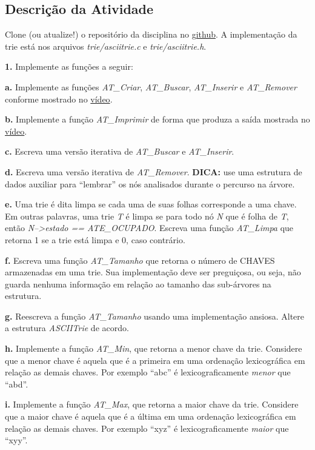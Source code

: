 \documentclass[]{article}
\begin{document}
\hypertarget{descriuxe7uxe3o-da-atividade}{%
\subsection{Descrição da Atividade}\label{descriuxe7uxe3o-da-atividade}}

Clone (ou atualize!) o repositório da disciplina no
\href{https://github.com/julianofoleiss/BCC33A}{github}. A implementação
da trie está nos arquivos \emph{trie/asciitrie.c} e
\emph{trie/asciitrie.h}.

\textbf{1.} Implemente as funções a seguir:

\textbf{a.} Implemente as funções \emph{AT\_Criar}, \emph{AT\_Buscar},
\emph{AT\_Inserir} e \emph{AT\_Remover} conforme mostrado no
\href{https://youtu.be/Spmw4hTo7ek}{vídeo}.

\textbf{b.} Implemente a função \emph{AT\_Imprimir} de forma que produza
a saída mostrada no \href{https://youtu.be/Spmw4hTo7ek?t=4155}{vídeo}.

\textbf{c.} Escreva uma versão iterativa de \emph{AT\_Buscar} e
\emph{AT\_Inserir}.

\textbf{d.} Escreva uma versão iterativa de \emph{AT\_Remover}.
\textbf{DICA:} use uma estrutura de dados auxiliar para ``lembrar'' os
nós analisados durante o percurso na árvore.

\textbf{e.} Uma trie é dita limpa se cada uma de suas folhas corresponde
a uma chave. Em outras palavras, uma trie \emph{T} é limpa se para todo
nó \emph{N} que é folha de \emph{T}, então \emph{N--\textgreater{}estado
== ATE\_OCUPADO}. Escreva uma função \emph{AT\_Limpa} que retorna 1 se a
trie está limpa e 0, caso contrário.

\textbf{f.} Escreva uma função \emph{AT\_Tamanho} que retorna o número
de CHAVES armazenadas em uma trie. Sua implementação deve ser
preguiçosa, ou seja, não guarda nenhuma informação em relação ao tamanho
das sub-árvores na estrutura.

\textbf{g.} Reescreva a função \emph{AT\_Tamanho} usando uma
implementação ansiosa. Altere a estrutura \emph{ASCIITrie} de acordo.

\textbf{h.} Implemente a função \emph{AT\_Min}, que retorna a menor
chave da trie. Considere que a menor chave é aquela que é a primeira em
uma ordenação lexicográfica em relação as demais chaves. Por exemplo
``abc'' é lexicograficamente \emph{menor} que ``abd''.

\textbf{i.} Implemente a função \emph{AT\_Max}, que retorna a maior
chave da trie. Considere que a maior chave é aquela que é a última em
uma ordenação lexicográfica em relação as demais chaves. Por exemplo
``xyz'' é lexicograficamente \emph{maior} que ``xyy''.
\end{document}
